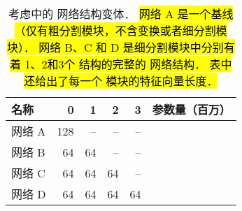 \renewcommand{\captiontitle}{考虑中的 \CNN{} 网络结构变体}
\begin{table*}
\begin{center}
\begin{tabular}{lrrrrr} \hline
\toprule
名称      & \UNet{} 0 & \UNet{} 1 & \UNet{} 2 & \UNet{} 3 & 参数量（百万） \\
\midrule
网络 A & 128       & --        & --        & --        & \MillionsOfParamsA{} \\
网络 B & 64        & 64        & --        & --        & \MillionsOfParamsB{} \\
网络 C & 64        & 64        & 64        & --        & \MillionsOfParamsC{} \\
网络 D & 64        & 64        & 64        & 64        & \MillionsOfParamsD{} \\
\bottomrule
\end{tabular}
\caption[\captiontitle{}]{
\captiontitle{}．
\hl{
网络 A 是一个基线 \UNet{}（仅有粗分割模块，不含变换或者细分割模块）．
网络 B、C 和 D 是细分割模块中分别有着 1、2和3个 \UNet{} 结构的完整的 \omeganet{} 网络结构．
表中还给出了每一个 \UNet{} 模块的特征向量长度．
}
}
\label{tab:architecture-descriptions}
\end{center}
\end{table*}
